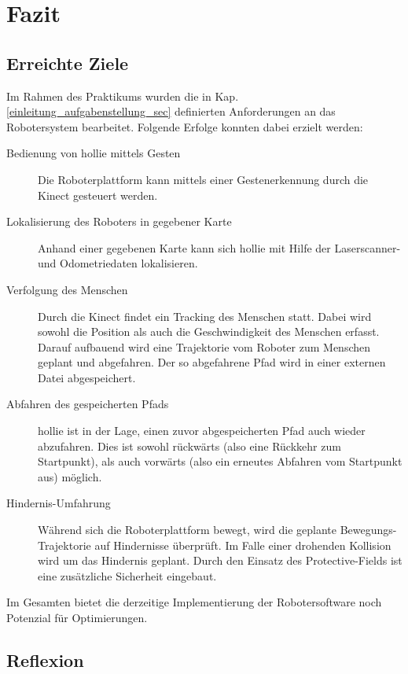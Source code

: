 
\chapter{Fazit}

\section{Erreichte Ziele}
\authorsection{\editorjulian, \editortobias}

Im Rahmen des Praktikums wurden die in Kap. \ref{einleitung_aufgabenstellung_sec} definierten Anforderungen an das Robotersystem bearbeitet.
Folgende Erfolge konnten dabei erzielt werden:

\begin{description}
  \item [Bedienung von \gls{hollie} mittels Gesten]
  		Die Roboterplattform kann mittels einer Gestenerkennung durch die Kinect gesteuert werden.
  \item [Lokalisierung des Roboters in gegebener Karte]
  		Anhand einer gegebenen Karte kann sich \gls{hollie} mit Hilfe der Laserscanner- und Odometriedaten lokalisieren.
  \item [Verfolgung des Menschen]
			Durch die Kinect findet ein Tracking des Menschen statt.
			Dabei wird sowohl die Position als auch die Geschwindigkeit des Menschen erfasst.
			Darauf aufbauend wird eine Trajektorie vom Roboter zum Menschen geplant und abgefahren.
			Der so abgefahrene Pfad wird in einer externen Datei abgespeichert. 
  \item [Abfahren des gespeicherten Pfads]
			\gls{hollie} ist in der Lage, einen zuvor abgespeicherten Pfad auch wieder abzufahren.
			Dies ist sowohl rückwärts (also eine Rückkehr zum Startpunkt), als auch vorwärts (also ein erneutes Abfahren vom Startpunkt aus) möglich.
  \item [Hindernis-Umfahrung]
			Während sich die Roboterplattform bewegt, wird die geplante Bewegungs-Trajektorie auf Hindernisse überprüft.
			Im Falle einer drohenden Kollision wird um das Hindernis geplant.
			Durch den Einsatz des Protective-Fields ist eine zusätzliche Sicherheit eingebaut.
\end{description}

Im Gesamten bietet die derzeitige Implementierung der Robotersoftware noch Potenzial für Optimierungen.

\section{Reflexion}
\authorsection{\editorandreas}
